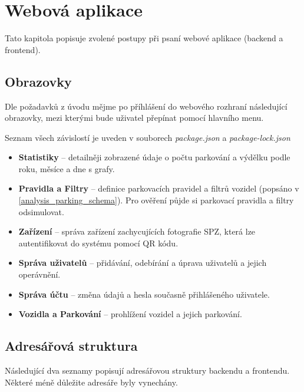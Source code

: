 
\chapter{Webová aplikace}

Tato kapitola popisuje zvolené postupy při psaní webové aplikace (backend a frontend).

\section{Obrazovky}

Dle požadavků z úvodu mějme po příhlášení do webového rozhraní následující obrazovky,
mezi kterými bude uživatel přepínat pomocí hlavního menu.

Seznam všech závislostí je uveden v souborech \textit{package.json} a \textit{package-lock.json}

\begin{itemize}
  \setlength\itemsep{.05em}
  \item \textbf{Statistiky} -- detailněji zobrazené údaje o počtu parkování a výdělku podle roku, měsíce a dne s grafy.
  \item \textbf{Pravidla a Filtry} -- definice parkovacích pravidel a filtrů vozidel (popsáno v \ref{analysis_parking_schema}).
        Pro ověření půjde si parkovací pravidla a filtry odsimulovat.
  \item \textbf{Zařízení} -- správa zařízení zachycujících fotografie SPZ, která lze autentifikovat do systému pomocí
        QR kódu.
  \item \textbf{Správa uživatelů} -- přidávání, odebírání a úprava uživatelů a jejich operávnění.
  \item \textbf{Správa účtu} -- změna údajů a hesla současně přihlášeného uživatele.
  \item \textbf{Vozidla a Parkování} -- prohlížení vozidel a jejich parkování.
\end{itemize}

\section{Adresářová struktura}

Následující dva seznamy popisují adresářovou struktury backendu a frontendu.
Některé méně důležite adresáře byly vynechány.


